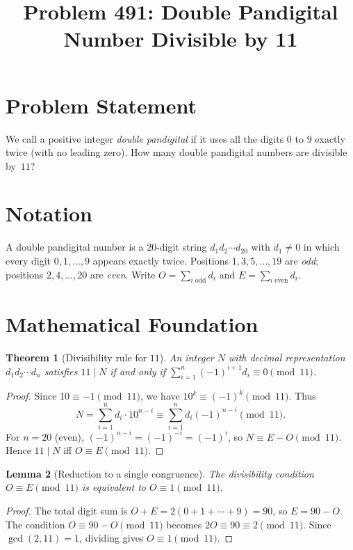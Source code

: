 \documentclass[12pt]{article}
\title{Problem 491: Double Pandigital Number Divisible by 11}
\author{}
\date{}
\newtheorem{theorem}{Theorem}
\newtheorem{lemma}[theorem]{Lemma}
\begin{document}
\maketitle

\section{Problem Statement}
We call a positive integer \emph{double pandigital} if it uses all the digits $0$ to $9$ exactly twice (with no leading zero). How many double pandigital numbers are divisible by~$11$?

\section{Notation}
A double pandigital number is a $20$-digit string $d_1 d_2 \cdots d_{20}$ with $d_1 \neq 0$ in which every digit $0,1,\ldots,9$ appears exactly twice. Positions $1,3,5,\ldots,19$ are \emph{odd}; positions $2,4,\ldots,20$ are \emph{even}. Write $O = \sum_{i\;\text{odd}} d_i$ and $E = \sum_{i\;\text{even}} d_i$.

\section{Mathematical Foundation}

\begin{theorem}[Divisibility rule for $11$]
An integer $N$ with decimal representation $d_1 d_2 \cdots d_n$ satisfies $11 \mid N$ if and only if $\sum_{i=1}^{n}(-1)^{i+1}d_i \equiv 0 \pmod{11}$.
\end{theorem}

\begin{proof}
Since $10 \equiv -1\pmod{11}$, we have $10^k \equiv (-1)^k\pmod{11}$. Thus
\[
N = \sum_{i=1}^{n} d_i\cdot 10^{n-i} \equiv \sum_{i=1}^{n} d_i(-1)^{n-i} \pmod{11}.
\]
For $n=20$ (even), $(-1)^{n-i} = (-1)^{-i} = (-1)^i$, so $N \equiv E - O \pmod{11}$. Hence $11 \mid N$ iff $O \equiv E\pmod{11}$.
\end{proof}

\begin{lemma}[Reduction to a single congruence]
The divisibility condition $O \equiv E \pmod{11}$ is equivalent to $O \equiv 1 \pmod{11}$.
\end{lemma}

\begin{proof}
The total digit sum is $O + E = 2(0+1+\cdots+9) = 90$, so $E = 90 - O$. The condition $O \equiv 90 - O\pmod{11}$ becomes $2O \equiv 90 \equiv 2\pmod{11}$. Since $\gcd(2,11)=1$, dividing gives $O \equiv 1 \pmod{11}$.
\end{proof}
\end{document}
